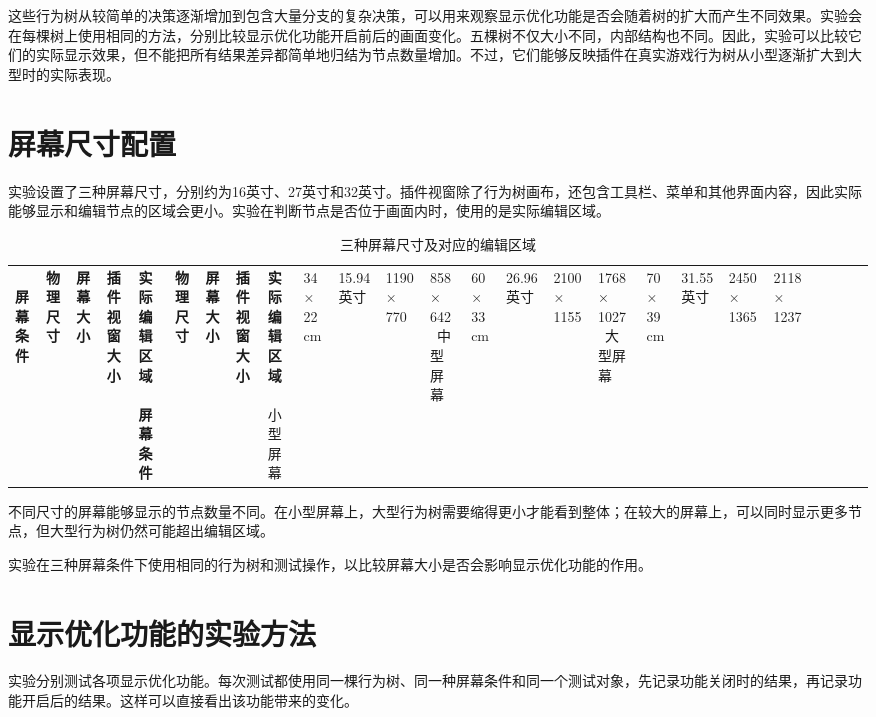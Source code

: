 \documentclass[11pt,a4paper,oneside,extrafontsizes]{memoir}
\begin{document}
这些行为树从较简单的决策逐渐增加到包含大量分支的复杂决策，可以用来观察显示优化功能是否会随着树的扩大而产生不同效果。实验会在每棵树上使用相同的方法，分别比较显示优化功能开启前后的画面变化。五棵树不仅大小不同，内部结构也不同。因此，实验可以比较它们的实际显示效果，但不能把所有结果差异都简单地归结为节点数量增加。不过，它们能够反映插件在真实游戏行为树从小型逐渐扩大到大型时的实际表现。

\section{屏幕尺寸配置}

实验设置了三种屏幕尺寸，分别约为16英寸、27英寸和32英寸。插件视窗除了行为树画布，还包含工具栏、菜单和其他界面内容，因此实际能够显示和编辑节点的区域会更小。实验在判断节点是否位于画面内时，使用的是实际编辑区域。


\begin{center}

\begin{longtable}{@{}p{} p{} p{} p{} p{}@{}}
\caption{三种屏幕尺寸及对应的编辑区域}\label{tab:screen-configs}\
\toprule
\textbf{屏幕条件} & \textbf{物理尺寸} & \textbf{屏幕大小} & \textbf{插件视窗大小} & \textbf{实际编辑区域} \
\midrule
\endfirsthead
\multicolumn{5}{l}{\itshape 续表}\
\toprule
\textbf{屏幕条件} & \textbf{物理尺寸} & \textbf{屏幕大小} & \textbf{插件视窗大小} & \textbf{实际编辑区域} \
\midrule
\endhead
小型屏幕 & 34 × 22 cm & 15.94英寸 & 1190 × 770 & 858 × 642 \
中型屏幕 & 60 × 33 cm & 26.96英寸 & 2100 × 1155 & 1768 × 1027 \
大型屏幕 & 70 × 39 cm & 31.55英寸 & 2450 × 1365 & 2118 × 1237 \
\bottomrule
\end{longtable}
\end{center}

不同尺寸的屏幕能够显示的节点数量不同。在小型屏幕上，大型行为树需要缩得更小才能看到整体；在较大的屏幕上，可以同时显示更多节点，但大型行为树仍然可能超出编辑区域。

实验在三种屏幕条件下使用相同的行为树和测试操作，以比较屏幕大小是否会影响显示优化功能的作用。

\section{显示优化功能的实验方法}

实验分别测试各项显示优化功能。每次测试都使用同一棵行为树、同一种屏幕条件和同一个测试对象，先记录功能关闭时的结果，再记录功能开启后的结果。这样可以直接看出该功能带来的变化。
\end{document}
